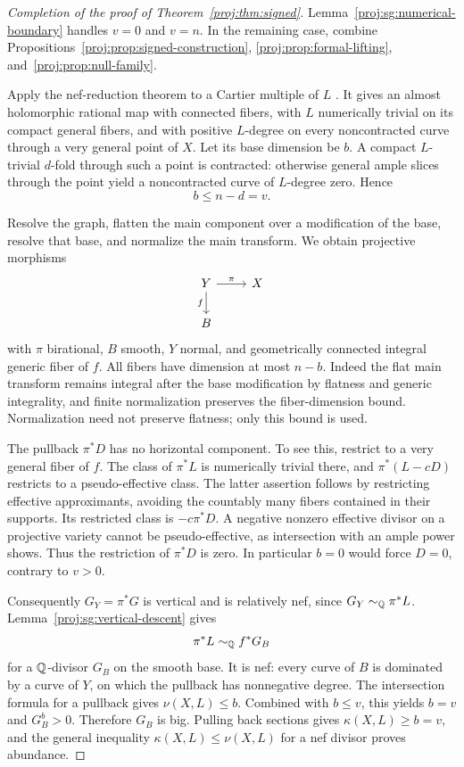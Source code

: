 \begin{proof}[Completion of the proof of Theorem~\ref{proj:thm:signed}]
Lemma~\ref{proj:sg:numerical-boundary} handles $v=0$ and $v=n$.
In the remaining case, combine
Propositions~\ref{proj:prop:signed-construction},
\ref{proj:prop:formal-lifting}, and~\ref{proj:prop:null-family}.

Apply the nef-reduction theorem to a Cartier multiple
of $L$ \cite[Theorem~2.1]{Proj-BauerEtAl2002}.  It gives an almost
holomorphic rational map with connected fibers, with
$L$ numerically trivial on its compact general fibers,
and with positive $L$-degree on every noncontracted
curve through a very general point of $X$.
Let its base dimension be $b$.  A compact $L$-trivial
$d$-fold through such a point is contracted: otherwise
general ample slices through the point yield a
noncontracted curve of $L$-degree zero.  Hence
\[
 b\le n-d=v.
\]

Resolve the graph, flatten the main component over a
modification of the base, resolve that base, and
normalize the main transform.  We obtain projective
morphisms
\[
 \begin{tikzcd}
 Y \arrow[r,"\pi"] \arrow[d,"f"'] & X\\
 B &
 \end{tikzcd}
\]
with $\pi$ birational, $B$ smooth, $Y$ normal, and
geometrically connected integral generic fiber of $f$.
All fibers have dimension at most $n-b$.
Indeed the flat main transform remains integral after
the base modification by flatness and generic
integrality, and finite normalization preserves the
fiber-dimension bound.  Normalization need not preserve
flatness; only this bound is used.

The pullback $\pi^*D$ has no horizontal component.
To see this, restrict to a very general fiber of $f$.
The class of $\pi^*L$ is numerically trivial there,
and $\pi^*(L-cD)$ restricts to a pseudo-effective class.
The latter assertion follows by restricting effective
approximants, avoiding the countably many fibers
contained in their supports.  Its restricted class is
$-c\pi^*D$.  A negative nonzero effective divisor on a
projective variety cannot be pseudo-effective, as
intersection with an ample power shows.  Thus the
restriction of $\pi^*D$ is zero.  In particular $b=0$
would force $D=0$, contrary to $v>0$.

Consequently $G_Y=\pi^*G$ is vertical and is relatively
nef, since $G_Y\sim_{\mathbb{Q}}\pi^*L$.  Lemma~\ref{proj:sg:vertical-descent}
gives
\[
 \pi^*L\sim_{\mathbb{Q}}f^*G_B
\]
for a $\mathbb{Q}$-divisor $G_B$ on the smooth base.
It is nef: every curve of $B$ is dominated by a curve
of $Y$, on which the pullback has nonnegative degree.
The intersection formula for a pullback gives
$\nu(X,L)\le b$.  Combined with $b\le v$, this yields
$b=v$ and $G_B^b>0$.  Therefore $G_B$ is big.
Pulling back sections gives
$\kappa(X,L)\ge b=v$, and the general inequality
$\kappa(X,L)\le\nu(X,L)$ for a nef divisor proves
abundance.
\end{proof}
